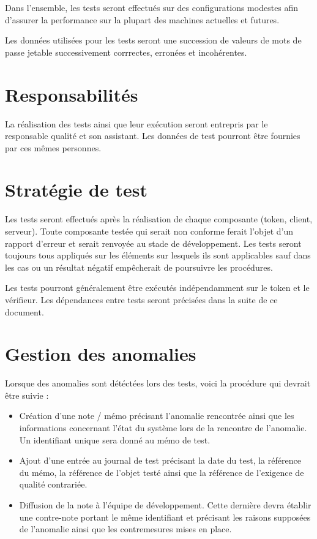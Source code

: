 \documentclass{"../../res/univ-projet"}
\begin{document}
  Dans l'ensemble, les tests seront effectués sur des configurations modestes afin d'assurer la performance sur la plupart des machines actuelles et futures.
  
  Les données utilisées pour les tests seront une succession de valeurs de mots de passe jetable successivement corrrectes, erronées et incohérentes.
  
  \section{Responsabilités}
  La réalisation des tests ainsi que leur ex\'ecution seront entrepris par le responsable qualité et son assistant. Les données de test pourront être fournies par ces 
  mêmes personnes.
  
  \section{Stratégie de test}
  Les tests seront effectués après la réalisation de chaque composante (token, client, serveur). Toute composante testée qui serait non conforme ferait l'objet d'un 
  rapport d'erreur et serait renvoyée au stade de développement.
  Les tests seront toujours tous appliqués sur les éléments sur lesquels ils sont applicables sauf dans les cas ou un résultat négatif empêcherait de poursuivre les 
  procédures.
  
  Les tests pourront généralement être exécutés indépendamment sur le token et le vérifieur. Les dépendances entre tests seront précisées dans la suite de ce document.
  
  \section{Gestion des anomalies}
  Lorsque des anomalies sont détéctées lors des tests, voici la procédure qui devrait être suivie :
  \begin{itemize}
   \item Création d'une note / mémo précisant l'anomalie rencontrée ainsi que les informations concernant l'état du système lors de la rencontre de l'anomalie. Un 
   identifiant unique sera donné au mémo de test.
   \item Ajout d'une entrée au journal de test précisant la date du test, la référence du mémo, la référence de l'objet testé ainsi que la référence de l'exigence de 
   qualité contrariée.
   \item Diffusion de la note à l'équipe de développement. Cette dernière devra établir une contre-note portant le même identifiant et précisant les raisons supposées 
   de l'anomalie ainsi que les contremesures mises en place. 
  \end{itemize}
\end{document}
